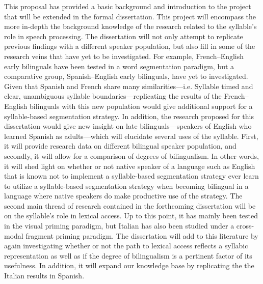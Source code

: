 This proposal has provided a basic background and introduction to the project that will be extended in the formal dissertation. This project will encompass the more in-depth the background knowledge of the research related to the syllable’s role in speech processing. The dissertation will not only attempt to replicate previous findings with a different speaker population, but also fill in some of the research veins that have yet to be investigated. For example, French–English early bilinguals have been tested in a word segmentation paradigm, but a comparative group, Spanish–English early bilinguals, have yet to investigated. Given that Spanish and French share many similarities—i.e. Syllable timed and clear, unambiguous syllable boundaries—replicating the results of the French–English bilinguals with this new population would give additional support for a syllable-based segmentation strategy. In addition, the research proposed for this dissertation would give new insight on late bilinguals—speakers of English who learned Spanish as adults—which will elucidate several uses of the syllable. First, it will provide research data on different bilingual speaker population, and secondly, it will allow for a comparison of degrees of bilingualism. In other words, it will shed light on whether or not native speaker of a language such as English that is known not to implement a syllable-based segmentation strategy ever learn to utilize a syllable-based segmentation strategy when becoming bilingual in a language where native speakers do make productive use of the strategy.
The second main thread of research contained in the forthcoming dissertation will be on the syllable’s role in lexical access. Up to this point, it has mainly been tested in the visual priming paradigm, but Italian has also been studied under a cross-modal fragment priming paradigm. The dissertation will add to this literature by again investigating whether or not the path to lexical access reflects a syllabic representation as well as if the degree of bilingualism is a pertinent factor of its usefulness. In addition, it will expand our knowledge base by replicating the the Italian results in Spanish. 
